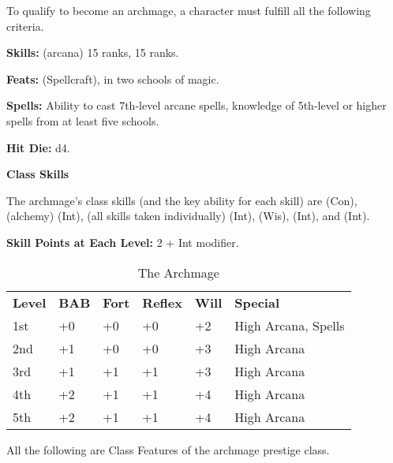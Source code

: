 
\Requirements

To qualify to become an archmage, a character must fulfill all the following criteria.

\textbf{Skills:}  (arcana) 15 ranks,  15 ranks.

\textbf{Feats:}  (Spellcraft),  in two schools of magic.

\textbf{Spells:} Ability to cast 7th-level arcane spells, knowledge of 5th-level 
or higher spells from at least five schools.

\Basics

\textbf{Hit Die:} d4.

\textbf{Class Skills}

The archmage's class skills (and the key ability for each skill) are  
(Con),  (alchemy) (Int),  (all skills taken individually) (Int), 
 (Wis),  (Int), and  (Int).

\textbf{Skill Points at Each Level:} 2 + Int modifier.

\begin{table}[htb]
\caption{The Archmage}
\centering
\begin{tabular}{*{6}{l}}
\textbf{Level} & \textbf{BAB} & \textbf{Fort} & \textbf{Reflex} & \textbf{Will} & \textbf{Special} \\
1st & +0 & +0 & +0 & +2 & High Arcana, Spells \\
2nd & +1 & +0 & +0 & +3 & High Arcana \\
3rd & +1 & +1 & +1 & +3 & High Arcana \\
4th & +2 & +1 & +1 & +4 & High Arcana \\
5th & +2 & +1 & +1 & +4 & High Arcana \\
\end{tabular}
\end{table}

\ClassFeatures

All the following are Class Features of the archmage prestige class.

